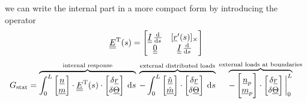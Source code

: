 \begin{frame}
  \vspace{1em}
  we can write the internal part in a more compact form by introducing the operator
  \begin{displaymath}
    \doubleunderline{E}^{\mathrm{T}}(s) =
    \begin{bmatrix}
      \doubleunderline{I} \, \od{}{s} & [ \underline{r}^{\prime}(s) ]_{\times} \\
      \doubleunderline{0}             & \doubleunderline{I} \, \od{}{s}
    \end{bmatrix}
  \end{displaymath}
  \begin{displaymath}
    G_{\text{stat}} = 
    \overbrace{
      \int_0^L
        \begin{bmatrix}
          \underline{n} \\ \underline{m}
        \end{bmatrix}
        \cdot \doubleunderline{E}^{\mathrm{T}}(s) \cdot
        \begin{bmatrix}
          \delta \underline{r} \\ \delta \underline{\Theta}
        \end{bmatrix}
      \: \dif s 
    }^{\text{internal response}} \:
    \overbrace{
      - \int_0^L
        \begin{bmatrix}
          \underline{\hat{n}} \\ \underline{\hat{m}}
        \end{bmatrix} \cdot
        \begin{bmatrix}
          \delta \underline{r} \\ \delta \underline{\Theta}
        \end{bmatrix}
      \: \dif s
    }^{\text{external distributed loads}} \:
    \overbrace{
      - \begin{bmatrix}
          \underline{n}_p \\ \underline{m}_p
      \end{bmatrix} \cdot
      \begin{bmatrix}
          \delta \underline{r} \\ \delta \underline{\Theta}
      \end{bmatrix}
      \sVert[3]_0^L
    }^{\text{external loads at boundaries}}
  \end{displaymath}

\end{frame}



